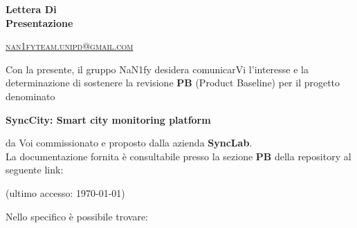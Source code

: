 \documentclass[8pt]{article}
\begin{document}
\begin{titlepage}
\begin{minipage}[t]{0.47\textwidth}
{		}
		\vspace{4mm}\vspace{4mm}
	\end{minipage}
	\vspace{4cm}
	\begin{center}
		\begin{flushright}
			{\fontsize{30pt}{52pt}\selectfont \textbf{Lettera Di \\Presentazione\\}} %
		\end{flushright}
		\vspace{3cm}
	\end{center}
	\vspace{8.5 cm}
	{\small \textsc{\href{mailto: nan1fyteam.unipd@gmail.com}{nan1fyteam.unipd@gmail.com}}}
\end{titlepage}
\pagestyle{mystyle}
\newpage
Con la presente, il gruppo NaN1fy desidera comunicarVi l'interesse e la determinazione di sostenere
la revisione \textbf{PB} (Product Baseline) per il
progetto denominato\\
\begin{center}
	\textbf{SyncCity: Smart city monitoring platform}
\end{center}
da Voi commissionato e proposto dalla azienda \textbf{SyncLab}.
\vspace{1em}
\\La documentazione fornita è consultabile presso la sezione \textbf{PB} della repository al seguente link:
\begin{center}
	\textbf{\href{https://github.com/NaN1fy/docs/tree/main/documents/PB}{\color{myblue}{https://github.com/NaN1fy/docs/tree/main/documents/PB}}}
    (ultimo accesso: \today)
\end{center}
Nello specifico è possibile trovare:
\end{document}

